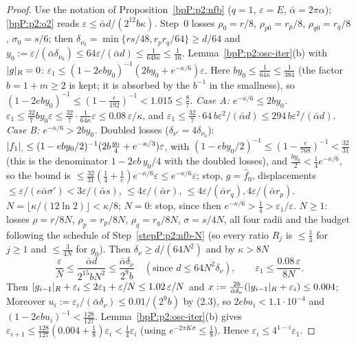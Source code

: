 \begin{proof}
Use the notation of Proposition~\ref{bpP:p2:nfb} ($q=1$, $\varepsilon=E$, $\bar\alpha=2\pi\alpha$); \ref{bpP:p2:o2} reads $\varepsilon\le\bar\alpha d/(2^{12}b\kappa)$. Step~0 losses $\rho_0=r/8$, $\rho_{p0}=r_p/8$, $\rho_{q0}=r_q/8$, $\sigma_0=s/6$; then $\delta_{\nu_0}=\min\{rs/48,r_pr_q/64\}\ge d/64$ and $y_0:=\varepsilon/(\bar\alpha\delta_{\nu_0})\le64\varepsilon/(\bar\alpha d)\le\frac1{64b\kappa}\le\frac1{16}$.
\label{stepP:p2:oa-first} Lemma~\ref{bpP:p2:osc-iter}(b) with $\lvert g\rvert_R=0$: $\varepsilon_1\le(1-2eby_0)^{-1}(2by_0+e^{-\kappa/6})\varepsilon$. Here $by_0\le\frac1{64\kappa}\le\frac1{384}$ (the factor $b=1+m\ge2$ is kept; it is absorbed by the $b^{-1}$ in the smallness), so $(1-2eby_0)^{-1}\le(1-\frac{e}{192})^{-1}<1.015\le\frac87$.
\emph{Case A: $e^{-\kappa/6}\le2by_0$.} $\varepsilon_1\le\frac{32}7by_0\varepsilon\le\frac{32}{7}\cdot\frac1{64\kappa}\varepsilon\le0.08\,\varepsilon/\kappa$, and $\varepsilon_1\le\frac{32}7\cdot64\,b\varepsilon^2/(\bar\alpha d)\le294\,b\varepsilon^2/(\bar\alpha d)$.
\emph{Case B: $e^{-\kappa/6}>2by_0$.} Doubled losses ($\delta_{\nu'}=4\delta_{\nu_0}$): $\lvert f_1\rvert_{,}\le(1-eby_0/2)^{-1}(2b\frac{y_0}4+e^{-\kappa/3})\varepsilon$, with $(1-eby_0/2)^{-1}\le(1-\frac e{768})^{-1}<\frac{32}{31}$ (this is the denominator $1-2eb\,y_0/4$ with the doubled losses), and $\frac{b y_0}2<\frac14e^{-\kappa/6}$, so the bound is $\le\frac{32}{31}(\frac14+\frac1e)e^{-\kappa/6}\varepsilon\le e^{-\kappa/6}\varepsilon$; stop, $g=\hat f_0$, displacements $\le\varepsilon/(e\bar\alpha\sigma')<3\varepsilon/(\bar\alpha s)$, $\le4\varepsilon/(\bar\alpha r)$, $\le4\varepsilon/(\bar\alpha r_{q}),4\varepsilon/(\bar\alpha r_p)$.
\label{stepP:p2:oa-iter} $N=\lfloor\kappa/(12\ln2)\rfloor<\kappa/8$; $N=0$: stop, since then $e^{-\kappa/6}>\frac14>\varepsilon_1/\varepsilon$. $N\ge1$: losses $\rho=r/8N$, $\rho_p=r_p/8N$, $\rho_q=r_q/8N$, $\sigma=s/4N$, all four radii and the budget following the schedule of Step~\ref{stepP:p2:nfb-N} (so every ratio $R_j$ is $\le\frac13$ for $j\ge1$ and $\le\frac3{4N}$ for $g_0$). Then $\delta_\nu\ge d/(64N^2)$ and by $\kappa>8N$
\[\frac\varepsilon N\le\frac{\bar\alpha d}{2^{15}bN^2}\le\frac{\bar\alpha\delta_\nu}{2^{9}b}\quad(\text{since }d\le64N^2\delta_\nu),\qquad\varepsilon_1\le\frac{0.08\,\varepsilon}{8N}.\tag{2.3}\]
Then $\lvert g_{i-1}\rvert_R+\varepsilon_i\le2\varepsilon_1+\varepsilon/N\le1.02\,\varepsilon/N$ and $x:=\frac{2b}{\bar\alpha\delta_\nu}(\lvert g_{i-1}\rvert_R+\varepsilon_i)\le0.004$; Moreover $u_i:=\varepsilon_i/(\bar\alpha\delta_\nu)\le0.01/(2^9b)$ by (2.3), so $2ebu_i<1.1\cdot10^{-4}$ and $(1-2ebu_i)^{-1}<\frac{128}{127}$. Lemma~\ref{bpP:p2:osc-iter}(b) gives $\varepsilon_{i+1}\le\frac{128}{127}(0.004+\frac18)\varepsilon_i<\frac14\varepsilon_i$ (using $e^{-2\pi K\sigma}\le\frac18$). Hence $\varepsilon_i\le4^{1-i}\varepsilon_1$.

\end{proof}

